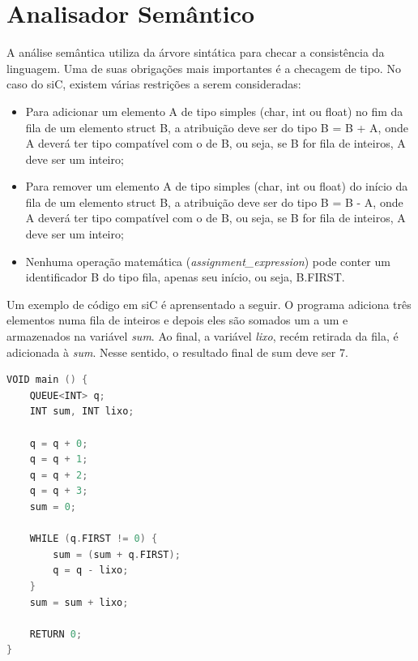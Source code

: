 \documentclass[12pt]{article}
\begin{document}
\section{Analisador Semântico} \label{AnalSem}

\indent A análise semântica utiliza da árvore sintática para checar a consistência da linguagem. Uma de suas obrigações mais importantes é a checagem de tipo. No caso do siC, existem várias restrições a serem consideradas:
\begin{itemize}
    \item Para adicionar um elemento A de tipo simples (char, int ou float) no fim da fila de um elemento struct B, a atribuição deve ser do tipo B = B + A, onde A deverá ter tipo compatível com o de B, ou seja, se B for fila de inteiros, A deve ser um inteiro;
    \item Para remover um elemento A de tipo simples (char, int ou float) do início da fila de um elemento struct B, a atribuição deve ser do tipo B = B - A, onde A deverá ter tipo compatível com o de B, ou seja, se B for fila de inteiros, A deve ser um inteiro;
    \item Nenhuma operação matemática (\textit{assignment\_expression}) pode conter um identificador B do tipo fila, apenas seu início, ou seja, B.FIRST.
\end{itemize}

\indent Um exemplo de código em siC é aprensentado a seguir. O programa adiciona três elementos numa fila de inteiros e depois eles são somados um a um e armazenados na variável \textit{sum}. Ao final, a variável \textit{lixo}, recém retirada da fila, é adicionada à \textit{sum}. Nesse sentido, o resultado final de sum deve ser 7. \\

\begin{lstlisting}[language=C]
VOID main () {
    QUEUE<INT> q;
    INT sum, INT lixo;

    q = q + 0;
    q = q + 1;
    q = q + 2;
    q = q + 3;    
    sum = 0;
    
    WHILE (q.FIRST != 0) {    
        sum = (sum + q.FIRST);
        q = q - lixo;
    }
    sum = sum + lixo;

    RETURN 0;
}

\end{lstlisting}

\end{document}
